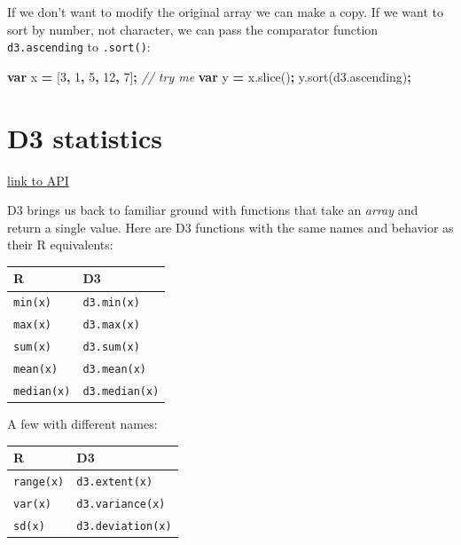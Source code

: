 \documentclass[openany]{book}
\newenvironment{Shaded}{\begin{snugshade}}{\end{snugshade}}
\newcommand{\AttributeTok}[1]{\textcolor[rgb]{0.77,0.63,0.00}{#1}}
\newcommand{\CommentTok}[1]{\textcolor[rgb]{0.56,0.35,0.01}{\textit{#1}}}
\newcommand{\DecValTok}[1]{\textcolor[rgb]{0.00,0.00,0.81}{#1}}
\newcommand{\KeywordTok}[1]{\textcolor[rgb]{0.13,0.29,0.53}{\textbf{#1}}}
\newcommand{\NormalTok}[1]{#1}
\newcommand{\OperatorTok}[1]{\textcolor[rgb]{0.81,0.36,0.00}{\textbf{#1}}}
\newcommand{\VariableTok}[1]{\textcolor[rgb]{0.00,0.00,0.00}{#1}}
\begin{document}
If we don't want to modify the original array we can make a copy. If we want to sort by number, not character, we can pass the comparator function \texttt{d3.ascending} to \texttt{.sort()}:

\begin{Shaded}
\begin{Highlighting}[]
\KeywordTok{var}\NormalTok{ x }\OperatorTok{=}\NormalTok{ [}\DecValTok{3}\OperatorTok{,} \DecValTok{1}\OperatorTok{,} \DecValTok{5}\OperatorTok{,} \DecValTok{12}\OperatorTok{,} \DecValTok{7}\NormalTok{]}\OperatorTok{;}     \CommentTok{// try me}
\KeywordTok{var}\NormalTok{ y }\OperatorTok{=} \VariableTok{x}\NormalTok{.}\AttributeTok{slice}\NormalTok{()}\OperatorTok{;}
\VariableTok{y}\NormalTok{.}\AttributeTok{sort}\NormalTok{(}\VariableTok{d3}\NormalTok{.}\AttributeTok{ascending}\NormalTok{)}\OperatorTok{;}
\end{Highlighting}
\end{Shaded}

\hypertarget{d3-statistics}{%
\section{D3 statistics}\label{d3-statistics}}

\href{https://github.com/d3/d3-array/blob/v1.2.4/README.md\#statistics}{link to API}

D3 brings us back to familiar ground with functions that take an \emph{array} and return a single value. Here are D3 functions with the same names and behavior as their R equivalents:

\begin{longtable}[]{@{}ll@{}}
\toprule
R & D3\tabularnewline
\midrule
\endhead
\texttt{min(x)} & \texttt{d3.min(x)}\tabularnewline
\texttt{max(x)} & \texttt{d3.max(x)}\tabularnewline
\texttt{sum(x)} & \texttt{d3.sum(x)}\tabularnewline
\texttt{mean(x)} & \texttt{d3.mean(x)}\tabularnewline
\texttt{median(x)} & \texttt{d3.median(x)}\tabularnewline
\bottomrule
\end{longtable}

A few with different names:

\begin{longtable}[]{@{}ll@{}}
\toprule
R & D3\tabularnewline
\midrule
\endhead
\texttt{range(x)} & \texttt{d3.extent(x)}\tabularnewline
\texttt{var(x)} & \texttt{d3.variance(x)}\tabularnewline
\texttt{sd(x)} & \texttt{d3.deviation(x)}\tabularnewline
\bottomrule
\end{longtable}
\end{document}
